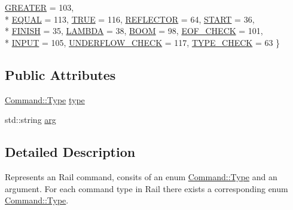 \begin{DoxyCompactItemize}
\hyperlink{structCommand_a4ca33b8d40e12deca5e7bb4190426ee1a1e91eb5b37ab7cc6f9ff0e773e8a47a5}{G\-R\-E\-A\-T\-E\-R} = 103, 
\\*
\hyperlink{structCommand_a4ca33b8d40e12deca5e7bb4190426ee1ac7cb579e3efb508f2ce9162c7fc4f894}{E\-Q\-U\-A\-L} = 113, 
\hyperlink{structCommand_a4ca33b8d40e12deca5e7bb4190426ee1af4a87f4688672121e2c76e20f4360391}{T\-R\-U\-E} = 116, 
\hyperlink{structCommand_a4ca33b8d40e12deca5e7bb4190426ee1a6266090f9a24e8780fcc58bbd3f3e433}{R\-E\-F\-L\-E\-C\-T\-O\-R} = 64, 
\hyperlink{structCommand_a4ca33b8d40e12deca5e7bb4190426ee1a3972753fd8c0c1d6d908c9691e740f4f}{S\-T\-A\-R\-T} = 36, 
\\*
\hyperlink{structCommand_a4ca33b8d40e12deca5e7bb4190426ee1af28ab76d25c104e01b8325a337558c21}{F\-I\-N\-I\-S\-H} = 35, 
\hyperlink{structCommand_a4ca33b8d40e12deca5e7bb4190426ee1a7ac408d60d087c6290f1e5eb7c16ba87}{L\-A\-M\-B\-D\-A} = 38, 
\hyperlink{structCommand_a4ca33b8d40e12deca5e7bb4190426ee1a4bea7fb36a4d87ca49e9944b5ca09ee4}{B\-O\-O\-M} = 98, 
\hyperlink{structCommand_a4ca33b8d40e12deca5e7bb4190426ee1acde4d704509b525b7d867d393d478a7a}{E\-O\-F\-\_\-\-C\-H\-E\-C\-K} = 101, 
\\*
\hyperlink{structCommand_a4ca33b8d40e12deca5e7bb4190426ee1ac1fa13fd13ccf87b7a1ff32aa521625e}{I\-N\-P\-U\-T} = 105, 
\hyperlink{structCommand_a4ca33b8d40e12deca5e7bb4190426ee1a9335b6cbcc604c61c8c851fe53baac28}{U\-N\-D\-E\-R\-F\-L\-O\-W\-\_\-\-C\-H\-E\-C\-K} = 117, 
\hyperlink{structCommand_a4ca33b8d40e12deca5e7bb4190426ee1a042a811243865383719e6d6e889ee7e1}{T\-Y\-P\-E\-\_\-\-C\-H\-E\-C\-K} = 63
 \}
\end{DoxyCompactItemize}
\subsection*{Public Attributes}
\begin{DoxyCompactItemize}
\item 
\hyperlink{structCommand_a4ca33b8d40e12deca5e7bb4190426ee1}{Command\-::\-Type} \hyperlink{structCommand_a9b682ee6829f8aa99c936997b9107686}{type}
\item 
std\-::string \hyperlink{structCommand_a2764694100839fad40df1dfd7be7145a}{arg}
\end{DoxyCompactItemize}


\subsection{Detailed Description}
Represents an Rail command, consits of an enum \hyperlink{structCommand_a4ca33b8d40e12deca5e7bb4190426ee1}{Command\-::\-Type} and an argument. For each command type in Rail there exists a corresponding enum \hyperlink{structCommand_a4ca33b8d40e12deca5e7bb4190426ee1}{Command\-::\-Type}.

